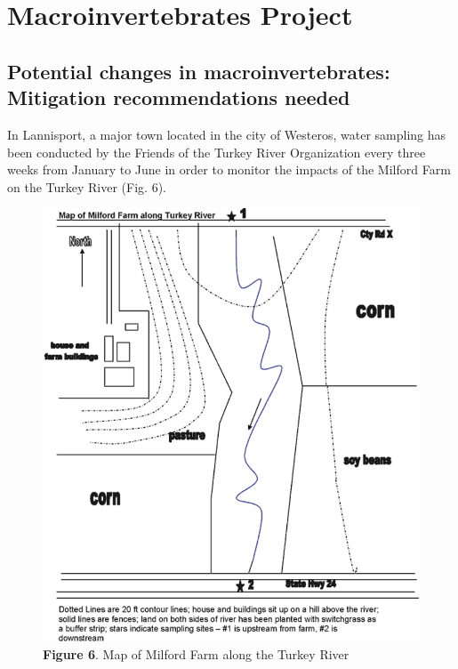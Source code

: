 \documentclass[
]{book}
\begin{document}
\hypertarget{macroinvertebrates-project}{%
\section*{Macroinvertebrates Project}\label{macroinvertebrates-project}}

\hypertarget{potential-changes-in-macroinvertebrates-mitigation-recommendations-needed}{%
\subsection*{Potential changes in macroinvertebrates: Mitigation recommendations needed}\label{potential-changes-in-macroinvertebrates-mitigation-recommendations-needed}}

In Lannisport, a major town located in the city of Westeros, water sampling has been conducted by the Friends of the Turkey River Organization every three weeks from January to June in order to monitor the impacts of the Milford Farm on the Turkey River (Fig. 6).

\begin{figure}
\centering
\includegraphics{images/figure6.png}
\caption{\textbf{Figure 6}. Map of Milford Farm along the Turkey River}
\end{figure}
\end{document}
